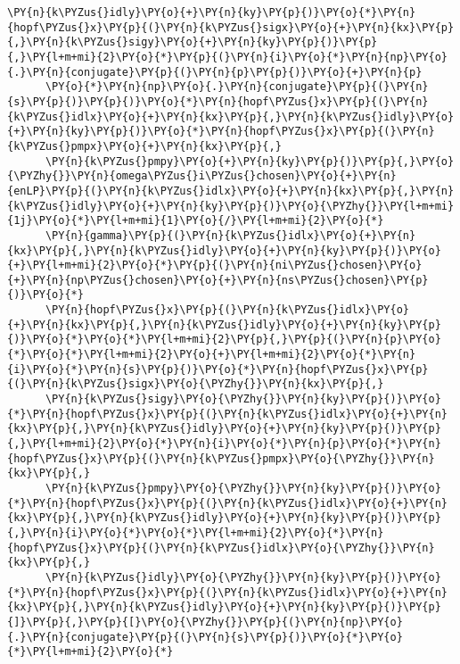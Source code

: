 \begin{Verbatim}[commandchars=\\\{\}]
      \PY{n}{k\PYZus{}idly}\PY{o}{+}\PY{n}{ky}\PY{p}{)}\PY{o}{*}\PY{n}{hopf\PYZus{}x}\PY{p}{(}\PY{n}{k\PYZus{}sigx}\PY{o}{+}\PY{n}{kx}\PY{p}{,}\PY{n}{k\PYZus{}sigy}\PY{o}{+}\PY{n}{ky}\PY{p}{)}\PY{p}{,}\PY{l+m+mi}{2}\PY{o}{*}\PY{p}{(}\PY{n}{i}\PY{o}{*}\PY{n}{np}\PY{o}{.}\PY{n}{conjugate}\PY{p}{(}\PY{n}{p}\PY{p}{)}\PY{o}{+}\PY{n}{p}
      \PY{o}{*}\PY{n}{np}\PY{o}{.}\PY{n}{conjugate}\PY{p}{(}\PY{n}{s}\PY{p}{)}\PY{p}{)}\PY{o}{*}\PY{n}{hopf\PYZus{}x}\PY{p}{(}\PY{n}{k\PYZus{}idlx}\PY{o}{+}\PY{n}{kx}\PY{p}{,}\PY{n}{k\PYZus{}idly}\PY{o}{+}\PY{n}{ky}\PY{p}{)}\PY{o}{*}\PY{n}{hopf\PYZus{}x}\PY{p}{(}\PY{n}{k\PYZus{}pmpx}\PY{o}{+}\PY{n}{kx}\PY{p}{,}
      \PY{n}{k\PYZus{}pmpy}\PY{o}{+}\PY{n}{ky}\PY{p}{)}\PY{p}{,}\PY{o}{\PYZhy{}}\PY{n}{omega\PYZus{}i\PYZus{}chosen}\PY{o}{+}\PY{n}{enLP}\PY{p}{(}\PY{n}{k\PYZus{}idlx}\PY{o}{+}\PY{n}{kx}\PY{p}{,}\PY{n}{k\PYZus{}idly}\PY{o}{+}\PY{n}{ky}\PY{p}{)}\PY{o}{\PYZhy{}}\PY{l+m+mi}{1j}\PY{o}{*}\PY{l+m+mi}{1}\PY{o}{/}\PY{l+m+mi}{2}\PY{o}{*}
      \PY{n}{gamma}\PY{p}{(}\PY{n}{k\PYZus{}idlx}\PY{o}{+}\PY{n}{kx}\PY{p}{,}\PY{n}{k\PYZus{}idly}\PY{o}{+}\PY{n}{ky}\PY{p}{)}\PY{o}{+}\PY{l+m+mi}{2}\PY{o}{*}\PY{p}{(}\PY{n}{ni\PYZus{}chosen}\PY{o}{+}\PY{n}{np\PYZus{}chosen}\PY{o}{+}\PY{n}{ns\PYZus{}chosen}\PY{p}{)}\PY{o}{*}
      \PY{n}{hopf\PYZus{}x}\PY{p}{(}\PY{n}{k\PYZus{}idlx}\PY{o}{+}\PY{n}{kx}\PY{p}{,}\PY{n}{k\PYZus{}idly}\PY{o}{+}\PY{n}{ky}\PY{p}{)}\PY{o}{*}\PY{o}{*}\PY{l+m+mi}{2}\PY{p}{,}\PY{p}{(}\PY{n}{p}\PY{o}{*}\PY{o}{*}\PY{l+m+mi}{2}\PY{o}{+}\PY{l+m+mi}{2}\PY{o}{*}\PY{n}{i}\PY{o}{*}\PY{n}{s}\PY{p}{)}\PY{o}{*}\PY{n}{hopf\PYZus{}x}\PY{p}{(}\PY{n}{k\PYZus{}sigx}\PY{o}{\PYZhy{}}\PY{n}{kx}\PY{p}{,}
      \PY{n}{k\PYZus{}sigy}\PY{o}{\PYZhy{}}\PY{n}{ky}\PY{p}{)}\PY{o}{*}\PY{n}{hopf\PYZus{}x}\PY{p}{(}\PY{n}{k\PYZus{}idlx}\PY{o}{+}\PY{n}{kx}\PY{p}{,}\PY{n}{k\PYZus{}idly}\PY{o}{+}\PY{n}{ky}\PY{p}{)}\PY{p}{,}\PY{l+m+mi}{2}\PY{o}{*}\PY{n}{i}\PY{o}{*}\PY{n}{p}\PY{o}{*}\PY{n}{hopf\PYZus{}x}\PY{p}{(}\PY{n}{k\PYZus{}pmpx}\PY{o}{\PYZhy{}}\PY{n}{kx}\PY{p}{,}
      \PY{n}{k\PYZus{}pmpy}\PY{o}{\PYZhy{}}\PY{n}{ky}\PY{p}{)}\PY{o}{*}\PY{n}{hopf\PYZus{}x}\PY{p}{(}\PY{n}{k\PYZus{}idlx}\PY{o}{+}\PY{n}{kx}\PY{p}{,}\PY{n}{k\PYZus{}idly}\PY{o}{+}\PY{n}{ky}\PY{p}{)}\PY{p}{,}\PY{n}{i}\PY{o}{*}\PY{o}{*}\PY{l+m+mi}{2}\PY{o}{*}\PY{n}{hopf\PYZus{}x}\PY{p}{(}\PY{n}{k\PYZus{}idlx}\PY{o}{\PYZhy{}}\PY{n}{kx}\PY{p}{,}
      \PY{n}{k\PYZus{}idly}\PY{o}{\PYZhy{}}\PY{n}{ky}\PY{p}{)}\PY{o}{*}\PY{n}{hopf\PYZus{}x}\PY{p}{(}\PY{n}{k\PYZus{}idlx}\PY{o}{+}\PY{n}{kx}\PY{p}{,}\PY{n}{k\PYZus{}idly}\PY{o}{+}\PY{n}{ky}\PY{p}{)}\PY{p}{]}\PY{p}{,}\PY{p}{[}\PY{o}{\PYZhy{}}\PY{p}{(}\PY{n}{np}\PY{o}{.}\PY{n}{conjugate}\PY{p}{(}\PY{n}{s}\PY{p}{)}\PY{o}{*}\PY{o}{*}\PY{l+m+mi}{2}\PY{o}{*}

\end{Verbatim}
